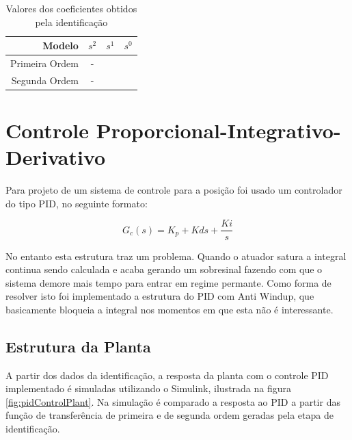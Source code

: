 \documentclass[a4paper,11pt]{article}
\begin{document}
\begin{table}[H]
    \centering
    \begin{tabular}{r|ccc}
    \hline
        Modelo & $s^2$ & $s^1$ & $s^0$ \\
     \hline
        Primeira Ordem & - & & \\
        Segunda Ordem & - & & \\
     \hline
    \end{tabular}
    \caption{Valores dos coeficientes obtidos pela identificação}
    \label{tab:tf}
\end{table}


\section{Controle Proporcional-Integrativo-Derivativo}


Para projeto de um sistema de controle para a posição foi usado um controlador do tipo PID, no seguinte formato:

\begin{equation}
    G_c(s) = K_p + Kd s + \frac{Ki}{s}
\end{equation}

No entanto esta estrutura traz um problema. Quando o atuador satura a integral continua sendo calculada e acaba gerando um sobresinal fazendo com que o sistema demore mais tempo para entrar em regime permante. Como forma de resolver isto foi implementado a estrutura do PID com Anti Windup, que basicamente bloqueia a integral nos momentos em que esta não é interessante.


\subsection{Estrutura da Planta}

A partir dos dados da identificação, a resposta da planta com o controle PID implementado é simuladas utilizando o Simulink, ilustrada na figura \ref{fig:pidControlPlant}. Na simulação é comparado a resposta ao PID a partir das função de transferência de primeira e de segunda ordem geradas pela etapa de identificação.
\end{document}
